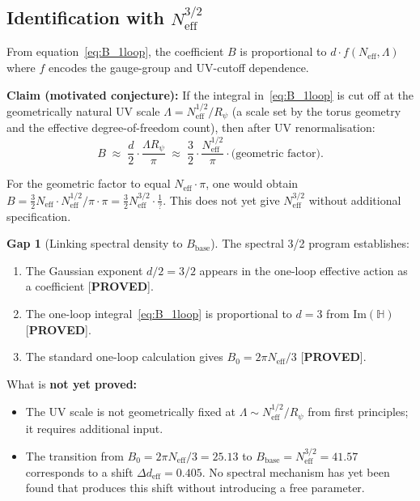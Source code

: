 \documentclass[11pt,a4paper]{article}
\theoremstyle{definition}
\newtheorem{gap}{Gap}
\theoremstyle{remark}
\begin{document}
\subsection{Identification with $N_{\mathrm{eff}}^{3/2}$}

From equation~\eqref{eq:B_1loop}, the coefficient $B$ is proportional to
$d \cdot f(N_{\mathrm{eff}}, \Lambda)$ where $f$ encodes the gauge-group and UV-cutoff dependence.

\textbf{Claim (motivated conjecture):}
If the integral in~\eqref{eq:B_1loop} is cut off at the geometrically
natural UV scale $\Lambda = N_{\mathrm{eff}}^{1/2}/R_\psi$
(a scale set by the torus geometry and the effective degree-of-freedom count),
then after UV renormalisation:
\begin{equation}
  B \;\approx\; \frac{d}{2} \cdot \frac{\Lambda R_\psi}{\pi}
  \;\approx\; \frac{3}{2} \cdot \frac{N_{\mathrm{eff}}^{1/2}}{\pi} \cdot \text{(geometric factor)}.
  \label{eq:B_claim}
\end{equation}

For the geometric factor to equal $N_{\mathrm{eff}} \cdot \pi$, one would obtain
$B = \frac{3}{2} N_{\mathrm{eff}} \cdot N_{\mathrm{eff}}^{1/2}/\pi \cdot \pi
= \frac{3}{2} N_{\mathrm{eff}}^{3/2} \cdot \frac{1}{?}$.
This does not yet give $N_{\mathrm{eff}}^{3/2}$ without additional specification.

\begin{gap}[Linking spectral density to $B_{\mathrm{base}}$]
\label{gap:B_base_link}
  The spectral 3/2 program establishes:
  \begin{enumerate}
    \item The Gaussian exponent $d/2 = 3/2$ appears in the one-loop effective
      action as a coefficient [\textbf{PROVED}].
    \item The one-loop integral~\eqref{eq:B_1loop} is proportional to $d = 3$
      from $\mathrm{Im}(\mathbb{H})$ [\textbf{PROVED}].
    \item The standard one-loop calculation gives $B_0 = 2\pi N_{\mathrm{eff}}/3$
      [\textbf{PROVED}].
  \end{enumerate}
  What is \textbf{not yet proved:}
  \begin{itemize}
    \item The UV scale is not geometrically fixed at $\Lambda \sim N_{\mathrm{eff}}^{1/2}/R_\psi$
      from first principles; it requires additional input.
    \item The transition from $B_0 = 2\pi N_{\mathrm{eff}}/3 = 25.13$ to
      $B_{\mathrm{base}} = N_{\mathrm{eff}}^{3/2} = 41.57$ corresponds to
      a shift $\Delta d_{\mathrm{eff}} = 0.405$.
      No spectral mechanism has yet been found that produces this shift without
      introducing a free parameter.
  \end{itemize}
\end{gap}
\end{document}
